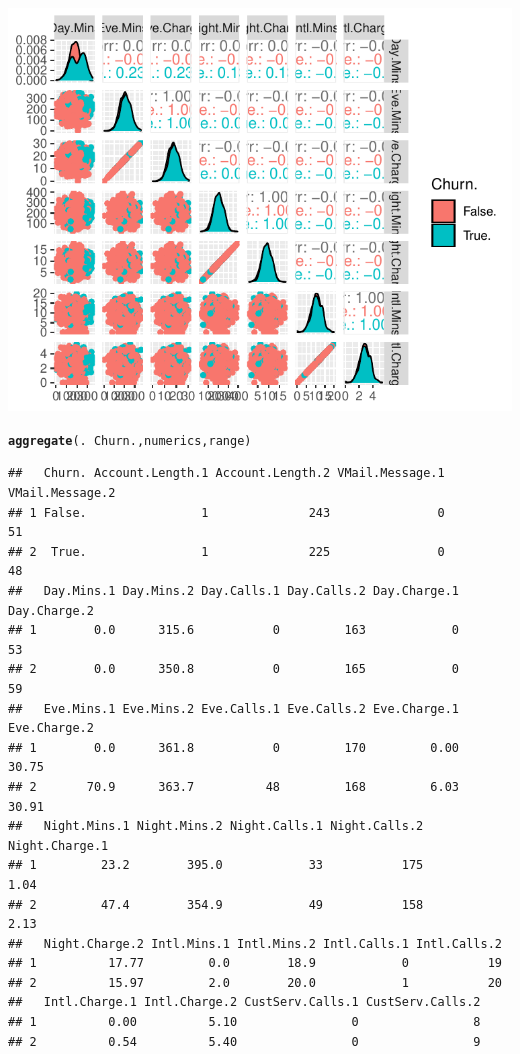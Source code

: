 \documentclass{article}\usepackage[]{graphicx}\usepackage[]{color}
\makeatletter
\def\maxwidth{ %
  \ifdim\Gin@nat@width>\linewidth
    \linewidth
  \else
    \Gin@nat@width
  \fi
}
\newcommand{\hlopt}[1]{\textcolor[rgb]{0,0,0}{#1}}%
\newcommand{\hlstd}[1]{\textcolor[rgb]{0.345,0.345,0.345}{#1}}%
\newcommand{\hlkwd}[1]{\textcolor[rgb]{0.737,0.353,0.396}{\textbf{#1}}}%
\newenvironment{kframe}{%
 \def\at@end@of@kframe{}%
 \ifinner\ifhmode%
  \def\at@end@of@kframe{\end{minipage}}%
  \begin{minipage}{\columnwidth}%
 \fi\fi%
 \def\FrameCommand##1{\hskip\@totalleftmargin \hskip-\fboxsep
 \colorbox{shadecolor}{##1}\hskip-\fboxsep
     \hskip-\linewidth \hskip-\@totalleftmargin \hskip\columnwidth}%
 \MakeFramed {\advance\hsize-\width
   \@totalleftmargin\z@ \linewidth\hsize
   \@setminipage}}%
 {\par\unskip\endMakeFramed%
 \at@end@of@kframe}
\newenvironment{knitrout}{}{} %
\makeatother
\begin{document}
\begin{description}
\begin{knitrout}
{\centering \includegraphics[width=\maxwidth]{figure/Pair_plot_for_continuous_variables_grouped-1} 

}



\end{knitrout}

\begin{knitrout}
\color{fgcolor}\begin{kframe}
\begin{alltt}
\hlkwd{aggregate}\hlstd{(.} \hlopt{~} \hlstd{Churn., numerics, range)}
\end{alltt}
\begin{verbatim}
##   Churn. Account.Length.1 Account.Length.2 VMail.Message.1 VMail.Message.2
## 1 False.                1              243               0              51
## 2  True.                1              225               0              48
##   Day.Mins.1 Day.Mins.2 Day.Calls.1 Day.Calls.2 Day.Charge.1 Day.Charge.2
## 1        0.0      315.6           0         163            0           53
## 2        0.0      350.8           0         165            0           59
##   Eve.Mins.1 Eve.Mins.2 Eve.Calls.1 Eve.Calls.2 Eve.Charge.1 Eve.Charge.2
## 1        0.0      361.8           0         170         0.00        30.75
## 2       70.9      363.7          48         168         6.03        30.91
##   Night.Mins.1 Night.Mins.2 Night.Calls.1 Night.Calls.2 Night.Charge.1
## 1         23.2        395.0            33           175           1.04
## 2         47.4        354.9            49           158           2.13
##   Night.Charge.2 Intl.Mins.1 Intl.Mins.2 Intl.Calls.1 Intl.Calls.2
## 1          17.77         0.0        18.9            0           19
## 2          15.97         2.0        20.0            1           20
##   Intl.Charge.1 Intl.Charge.2 CustServ.Calls.1 CustServ.Calls.2
## 1          0.00          5.10                0                8
## 2          0.54          5.40                0                9
\end{verbatim}
\end{kframe}
\end{knitrout}


\end{description}
\end{document}
